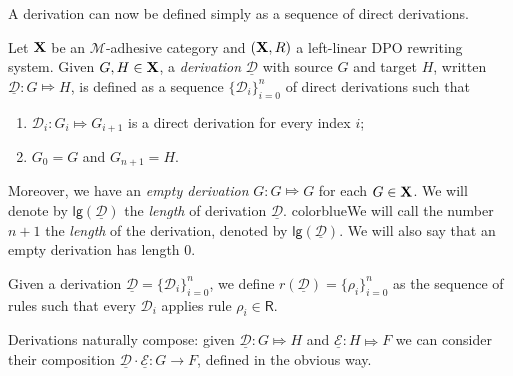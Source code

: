 \documentclass[a4paper,UKenglish,cleveref,pdftex,thm-restate,numberwithinsect,anonymous]{lipics}
\newcommand{\full}[1]{{color{blue}#1}}
\newcommand{\full}[1]{}
\def\R{\mathsf{R}}
\def\X{\textbf {\textup{X}}}
\newcommand{\dder}[1]{\mathscr{#1}}
\newcommand{\der}[1]{\underline{\dder{#1}}}
\newcommand{\lgh}[0]{\mathsf{lg}}
\begin{document}
A derivation can now be defined simply as a sequence of direct derivations.

\begin{definition}[Derivation]
  Let  $\X$ be an $\mathcal{M}$-adhesive category and 
  $(\X, \R)$ a left-linear DPO rewriting system. 
  Given $G, H \in \X$, a \emph{derivation}
  $\der{D}$ with source $G$ and target $H$, written
  $\der{D}: G \Mapsto H$, is defined as a sequence
  $\{\dder{D}_i\}_{i=0}^n$ of direct derivations such that
  \begin{enumerate}
  \item $\dder{D}_i : G_i \Mapsto G_{i+1}$ is a direct derivation for
    every index $i$;
  \item $G_0=G$ and $G_{n+1}=H$.
  \end{enumerate}
  Moreover, we have an \emph{empty derivation} $G : G \Mapsto G$ for each $G \in \X$.
  We will denote by $\lgh(\der{D})$ the \emph{length} of derivation $\der{D}$.
  \full{We will call the number $n+1$ the \emph{length} of the derivation,
  denoted by $\lgh(\der{D})$. We will also say that an empty
  derivation has length $0$.}

 Given a derivation $\der{D}=\{\dder{D}_i\}_{i=0}^n$, we define $r(\der{D})  = \{\rho_i\}_{i=0}^n$ as the sequence of 
 rules such that every $\dder{D}_i$ applies rule $\rho_i\in \R$.  
\end{definition}

Derivations naturally compose: given $\der{D}: G \Mapsto H$ and $\der{E}: H \Mapsto F$ we can consider their composition $\der{D} \cdot \der{E}: G \to F$, defined in the obvious way.

\end{document}
